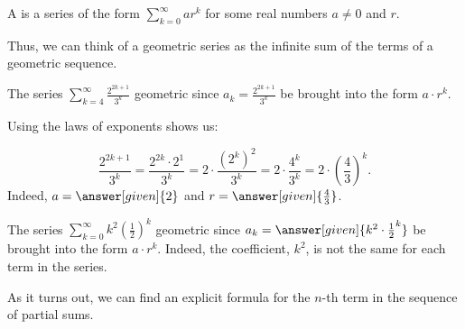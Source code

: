 \documentclass{ximera}
\begin{document}
\begin{definition}
  A  is a series of the form $\sum_{k=0}^\infty ar^k$
  for some real numbers $a \ne 0$ and $r$.
\end{definition}

Thus, we can think of a geometric series as the infinite sum of the terms of a geometric sequence.  

\begin{example}
The series $\sum_{k=4}^\infty \frac{2^{2k+1}}{3^k}$  geometric since $a_k =\frac{2^{2k+1}}{3^k}$  be brought into the form $a \cdot r^k$.  

Using the laws of exponents shows us:

\[
\frac{2^{2k+1}}{3^k} = \frac{2^{2k} \cdot 2^1}{3^k}= 2 \cdot \frac{\left(2^{k}\right)^2}{3^k} = 2 \cdot \frac{4^k}{3^k} = 2 \cdot \left(\frac{4}{3}\right)^k.
\]
Indeed, $a= \answer[given]{2}$ and $r = \answer[given]{\frac{4}{3}}$.
\end{example}

\begin{example}
The series $\sum_{k=0}^\infty k^2 \left(\frac{1}{2}\right)^k$  geometric since $a_k = \answer[given]{k^2 \cdot \frac{1}{2}^k}$  be brought into the form $a \cdot r^k$.  Indeed, the coefficient, $k^2$, is not the same for each term in the series.
\end{example}

As it turns out, we can find an explicit formula for the $n$-th term in the sequence of partial sums.

\end{document}
